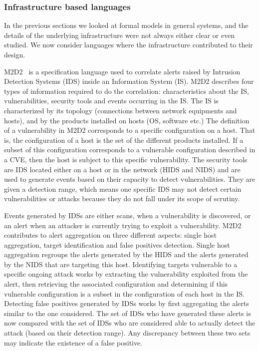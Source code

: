 \subsubsection{Infrastructure based languages}
In the previous sections we looked at formal models in general systems, and the details of the underlying infrastructure were not always either clear or even studied. We now consider languages where the infrastructure contributed to their design.

M2D2~\cite{M2D2-Morin2002} is a specification language used to correlate alerts raised by Intrusion Detection Systems (IDS) inside an Information System (IS).
M2D2 describes four types of information required to do the correlation: characteristics about the IS, vulnerabilities, security tools and events occurring in the IS.
The IS is characterized by its topology (connections between network equipments and hosts), and by the products installed on hosts (\eg OS, software etc.)
The definition of a vulnerability in M2D2 corresponds to a specific configuration on a host.
That is, the configuration of a host is the set of the different products installed.
If a subset of this configuration corresponds to a vulnerable configuration described in a CVE, then the host is subject to this specific vulnerability.
The security tools are IDS located either on a host or in the network (HIDS and NIDS) and are used to generate events based on their capacity to detect vulnerabilities.
They are given a detection range, which means one specific IDS may not detect certain vulnerabilities or attacks because they do not fall under its scope of scrutiny. 

Events generated by IDSs are either scans, when a vulnerability is discovered, or an alert when an attacker is currently trying to exploit a vulnerability.
M2D2 contributes to alert aggregation on three different aspects: single host aggregation, target identification and false positives detection.
Single host aggregation regroups the alerts generated by the HIDS and the alerts generated by the NIDS that are targeting this host.
Identifying targets vulnerable to a specific ongoing attack works by extracting the vulnerability exploited from the alert, then retrieving the associated configuration and determining if this vulnerable configuration is a subset in the configuration of each host in the IS.
Detecting false positives generated by IDSs works by first aggregating the alerts similar to the one considered.
The set of IDSs who have generated these alerts is now compared with the set of IDSs who are considered able to actually detect the attack (based on their detection range).
Any discrepancy between these two sets may indicate the existence of a false positive.

